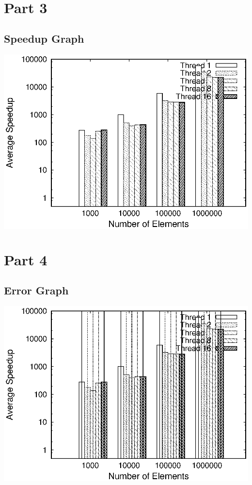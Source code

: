 \documentclass{article}
\begin{document}
\section{Part 3}
\subsection{Speedup Graph}
\includegraphics{speedup}
\section{Part 4}
\subsection{Error Graph}
\includegraphics{speedup_errorbar}
\end{document}
